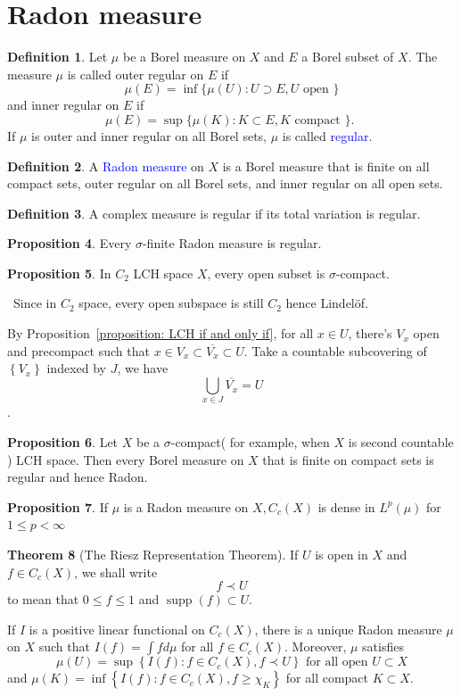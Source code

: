 \documentclass[12pt,a4paper]{book}
\newenvironment{prooff}{{\noindent\it\textcolor{cyan!40!black}{Proof}:}\,}{\par}
\newcommand{\bbrace}[1]{\left\{ #1 \right\} }
\newcommand{\blue}[1]{\textcolor{blue}{#1}}
\theoremstyle{definition}
\newtheorem{defn}{Definition}[section]
\newtheorem{theo}[defn]{Theorem}
\newtheorem{prop}[defn]{Proposition}
\begin{document}
\section{Radon measure}
\begin{defn}
    Let $\mu$ be a Borel measure on $X$ and $E$ a Borel subset of $X$. The measure $\mu$ is called outer regular on $E$ if
    $$
        \mu(E)=\inf \{\mu(U): U \supset E, U \text { open }\}
    $$
    and inner regular on $E$ if
    $$
        \mu(E)=\sup \{\mu(K): K \subset E, K \text { compact }\} \text {. }
    $$
    If $\mu$ is outer and inner regular on all Borel sets,
    $\mu$ is called \blue{regular}.
\end{defn}
\begin{defn}
    A \blue{Radon measure} on $X$ is a Borel measure that is finite on all compact sets, outer regular on all Borel sets, and inner regular on all open sets.
\end{defn}
\begin{defn}
    A complex measure is regular if its total variation is regular.
\end{defn}
\begin{prop}
    Every $\sigma$-finite Radon measure is regular.
\end{prop}
\begin{prop}
    In $C_2$ LCH space $X$, every open subset is $\sigma$-compact.
\end{prop}
\begin{prooff}
    Since in $C_2$ space, every open subspace is still $C_2$ hence Lindelöf.

    By Proposition~\ref{proposition: LCH if and only if}, for all $x\in U$, there's $V_x$ open and precompact such that $x\in V_x\subset  \overline{V_x}\subset U$.
    Take a countable subcovering of $\bbrace{V_x}$ indexed by $J$, we have 
    $$
    \bigcup_{x\in J} \overline{V_x}=U
    $$.
\end{prooff}
\begin{prop}
    Let $X$ be a $\sigma$-compact( for example, when $X$ is second countable ) LCH space.
    Then every Borel measure on $X$ that is finite on compact sets is regular and hence Radon.
\end{prop}
\begin{prop}
    If $\mu$ is a Radon measure on $X, C_c(X)$ is dense in $L^p(\mu)$ for $1 \leq p<\infty$
\end{prop}
\begin{theo}[The Riesz Representation Theorem]
    If $U$ is open in $X$ and $f \in C_c(X)$, we shall write
    $$
        f \prec U
    $$
    to mean that $0 \leq f \leq 1$ and $\operatorname{supp}(f) \subset U$.

    If $I$ is a positive linear functional on $C_c(X)$, there is a unique Radon measure $\mu$ on $X$ such that $I(f)=\int f d \mu$ for all $f \in C_c(X)$. Moreover, $\mu$ satisfies
    $$
        \mu(U)=\sup \left\{I(f): f \in C_c(X), f \prec U\right\} \text { for all open } U \subset X
    $$
    and
    $\mu(K)=\inf \left\{I(f): f \in C_c(X), f \geq \chi_K\right\}$ for all compact $K \subset X$.
\end{theo}
\end{document}
